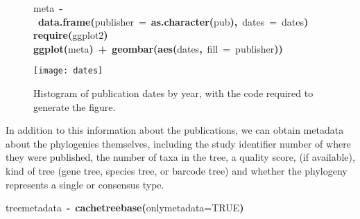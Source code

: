 \documentclass[authoryear, preprint]{elsarticle}
\makeatletter
\newcommand{\hlnumber}[1]{\textcolor[rgb]{0,0,0}{#1}}%
\newcommand{\hlfunctioncall}[1]{\textcolor[rgb]{.5,0,.33}{\textbf{#1}}}%
\newcommand{\hlkeyword}[1]{\textbf{#1}}%
\newcommand{\hlargument}[1]{\textcolor[rgb]{.69,.25,.02}{#1}}%
\newcommand{\hlassignement}[1]{\textbf{#1}}%
\newcommand{\hlsymbol}[1]{#1}%
\newcommand{\hlstd}[1]{\textcolor[rgb]{0,0,0}{#1}}%
\newenvironment{kframe}{%
 \def\FrameCommand##1{\hskip\@totalleftmargin \hskip-\fboxsep
 \colorbox{shadecolor}{##1}\hskip-\fboxsep
     \hskip-\linewidth \hskip-\@totalleftmargin \hskip\columnwidth}%
 \MakeFramed {\advance\hsize-\width
   \@totalleftmargin\z@ \linewidth\hsize
   \@setminipage}}%
 {\par\unskip\endMakeFramed}
\newenvironment{knitrout}{}{} %
\makeatother
\begin{document}
\begin{figure}
\begin{center}
\begin{knitrout}
\color{fgcolor}\begin{kframe}
\begin{flushleft}
\ttfamily\noindent
\hlsymbol{meta}{\ }\hlassignement{\usebox{\hlnormalsizeboxlessthan}-}{\ }\hlfunctioncall{data.frame}\hlkeyword{(}\hlargument{publisher}{\ }\hlargument{=}{\ }\hlfunctioncall{as.character}\hlkeyword{(}\hlsymbol{pub}\hlkeyword{)}\hlkeyword{,}{\ }\hlargument{dates}{\ }\hlargument{=}{\ }\hlsymbol{dates}\hlkeyword{)}\hspace*{\fill}\\
\hlstd{}\hlfunctioncall{require}\hlkeyword{(}\hlsymbol{ggplot2}\hlkeyword{)}\hspace*{\fill}\\
\hlstd{}\hlfunctioncall{ggplot}\hlkeyword{(}\hlsymbol{meta}\hlkeyword{)}{\ }\hlkeyword{+}{\ }\hlfunctioncall{geom\usebox{\hlnormalsizeboxunderscore}bar}\hlkeyword{(}\hlfunctioncall{aes}\hlkeyword{(}\hlsymbol{dates}\hlkeyword{,}{\ }\hlargument{fill}{\ }\hlargument{=}{\ }\hlsymbol{publisher}\hlkeyword{)}\hlkeyword{)}\mbox{}
\normalfont
\end{flushleft}
\texttt{[image: dates]} \end{kframe}
\end{knitrout}

\caption{Histogram of publication dates by year, with the code required to generate the figure.}\label{fig:1}
\end{center}
\end{figure}

In addition to this information about the publications, we can obtain metadata about the phylogenies themselves, including the study identifier number of where they were published, the number of taxa in the tree, a quality score, (if available), kind of tree (gene tree, species tree, or barcode tree) and whether the phylogeny represents a single or consensus type.  
\begin{knitrout}
\color{fgcolor}\begin{kframe}
\begin{flushleft}
\ttfamily\noindent
\hlsymbol{tree\usebox{\hlnormalsizeboxunderscore}metadata}{\ }\hlassignement{\usebox{\hlnormalsizeboxlessthan}-}{\ }\hlfunctioncall{cache\usebox{\hlnormalsizeboxunderscore}treebase}\hlkeyword{(}\hlargument{only\usebox{\hlnormalsizeboxunderscore}metadata}\hlargument{=}\hlnumber{TRUE}\hlkeyword{)}\mbox{}
\normalfont
\end{flushleft}
\end{kframe}
\end{knitrout}
\end{document}
